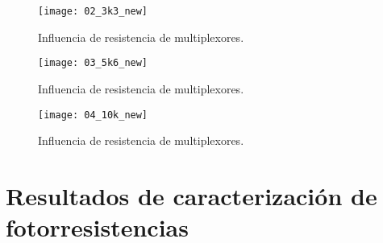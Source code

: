             \begin{figure}[hbtp]
                \centering
                \texttt{[image: 02\_3k3\_new]}
                \caption{Influencia de resistencia de multiplexores.}
                \label{fig:02_3k3_new}
            \end{figure}              
 
            \begin{figure}[hbtp]
                \centering
                \texttt{[image: 03\_5k6\_new]}
                \caption{Influencia de resistencia de multiplexores.}
                \label{fig:03_5k6_new}
            \end{figure}   

            \begin{figure}[hbtp]
                \centering
                \texttt{[image: 04\_10k\_new]}
                \caption{Influencia de resistencia de multiplexores.}
                \label{fig:04_10k_new}
            \end{figure}  
                
\newpage                      
\section{Resultados de caracterización de fotorresistencias}


